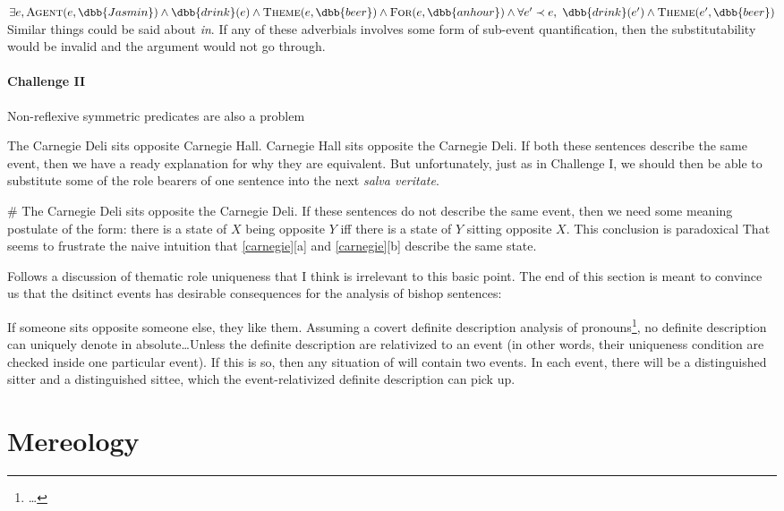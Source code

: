 \ex
 $\exists e, \textsc{Agent}(e, \dbb{Jasmin}) \wedge \dbb{drink}(e)\wedge \textsc{Theme}(e, \dbb{beer}) \wedge \textsc{For}(e, \dbb{an hour}) \wedge \forall e'\prec e,\ \dbb{drink}(e')\wedge \textsc{Theme}(e', \dbb{beer})$ 
\xe
%
Similar things could be said about \emph{in}. If any of these adverbials involves some form of sub-event quantification, then the substitutability would be invalid and the argument would not go through.

\paragraph{Challenge II}
Non-reflexive symmetric predicates are also a problem

\pex \label{carnegie}
\a 
The Carnegie Deli sits opposite Carnegie Hall.
\a 
Carnegie Hall sits opposite the Carnegie Deli.
\xe
%
If both these sentences describe the same event, then we have a ready explanation for why they are equivalent. But unfortunately, just as in Challenge I, we should then be able to substitute some of the role bearers of one sentence into the next \emph{salva veritate}.

\ex
\# The Carnegie Deli sits opposite the Carnegie Deli.
\xe
%
 If these sentences do not describe the same event, then we need some meaning postulate of the form: there is a state of $X$ being opposite $Y$ iff there is a state of $Y$ sitting opposite $X$. This conclusion is paradoxical That seems to frustrate the naive intuition that \cref{carnegie}[a] and \cref{carnegie}[b] describe the same state.

 Follows a discussion of thematic role uniqueness that I think is irrelevant to this basic point. The end of this section is meant to convince us that the dsitinct events has desirable consequences for the analysis of bishop sentences:

 \ex
 If someone sits opposite someone else, they like them.
 \xe
 Assuming a covert definite description analysis of pronouns\footnote{\ldots}, no definite description can uniquely denote in absolute\ldots Unless the definite description are relativized to an event (in other words, their uniqueness condition are checked inside one particular event). If this is so, then any situation of  will contain two events. In each event, there will be a distinguished sitter and a distinguished sittee, which the event-relativized definite description can pick up.

 \section{Mereology}

